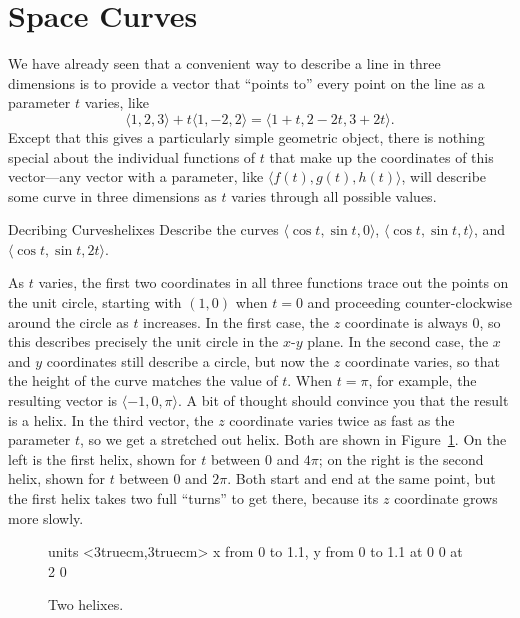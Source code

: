 \section{Space Curves}\label{sec:SpaceCurves}

We have already seen that a convenient way to describe a line in three
dimensions is to provide a vector that ``points to'' every point on
the line as a parameter $t$ varies, like
$$\langle 1,2,3\rangle+t\langle 1,-2,2\rangle
=\langle 1+t,2-2t,3+2t\rangle.$$
Except that this gives a particularly simple geometric object, there
is nothing special about the individual functions of $t$ that make up
the coordinates of this vector---any vector with a parameter, like
$\langle f(t),g(t),h(t)\rangle$, will describe some curve in three
dimensions as $t$ varies through all possible values. 

\begin{example}{Decribing Curves}{helixes}
Describe the curves
$\langle \cos t,\sin t,0\rangle$,
$\langle \cos t,\sin t,t\rangle$, and
$\langle \cos t,\sin t,2t\rangle$.
\end{example}
\begin{solution}
As $t$ varies, the first two coordinates in all three functions
trace out the points on the unit circle, starting
with $(1,0)$ when $t=0$ and proceeding counter-clockwise around the
circle as $t$ increases. In the first case, the $z$ coordinate is
always 0, so this describes precisely the unit circle in the $x$-$y$
plane. In the second case, the $x$ and $y$ coordinates still describe
a circle, but now 
the $z$ coordinate varies, so that the
height of the curve matches the value of $t$. When $t=\pi$, for
example, the resulting vector is $\langle -1,0,\pi\rangle$. A bit of
thought should convince you that the result is a helix. In the third
vector, the $z$ coordinate varies twice as fast as the parameter $t$,
so we get a stretched out helix. Both are shown in
Figure~\ref{fig:helixes}. On the left is the first helix, shown for
$t$ between 0 and $4\pi$; on the right is the second helix, shown for
$t$ between 0 and $2\pi$. Both start and end at the same point, but
the first helix takes two full ``turns'' to get there, because its $z$
coordinate grows more slowly.
\end{solution}

\begin{figure}[H]
\centerline{
\vbox{\beginpicture
\normalgraphs
\setcoordinatesystem units <3truecm,3truecm>
\setplotarea x from 0 to 1.1, y from 0 to 1.1
 at 0 0
 at 2 0
\endpicture}}
\caption{Two helixes. \label{fig:helixes}}
\end{figure}

